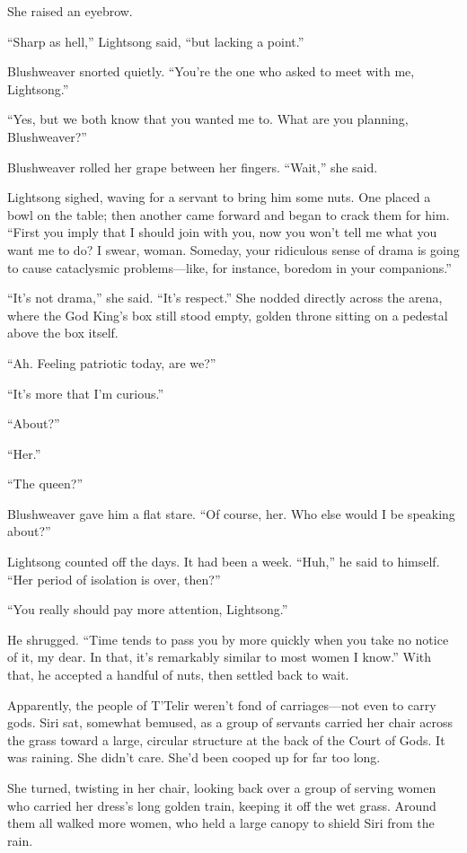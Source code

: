 She raised an eyebrow.

“Sharp as hell,” Lightsong said, “but lacking a point.”

Blushweaver snorted quietly. “You’re the one who asked to meet with me, Lightsong.”

“Yes, but we both know that you wanted me to. What are you planning, Blushweaver?”

Blushweaver rolled her grape between her fingers. “Wait,” she said.

Lightsong sighed, waving for a servant to bring him some nuts. One placed a bowl on the table; then another came forward and began to crack them for him. “First you imply that I should join with you, now you won’t tell me what you want me to do? I swear, woman. Someday, your ridiculous sense of drama is going to cause cataclysmic problems—like, for instance, boredom in your companions.”

“It’s not drama,” she said. “It’s respect.” She nodded directly across the arena, where the God King’s box still stood empty, golden throne sitting on a pedestal above the box itself.

“Ah. Feeling patriotic today, are we?”

“It’s more that I’m curious.”

“About?”

“Her.”

“The queen?”

Blushweaver gave him a flat stare. “Of course, her. Who else would I be speaking about?”

Lightsong counted off the days. It had been a week. “Huh,” he said to himself. “Her period of isolation is over, then?”

“You really should pay more attention, Lightsong.”

He shrugged. “Time tends to pass you by more quickly when you take no notice of it, my dear. In that, it’s remarkably similar to most women I know.” With that, he accepted a handful of nuts, then settled back to wait.

\orn

Apparently, the people of T’Telir weren’t fond of carriages—not even to carry gods. Siri sat, somewhat bemused, as a group of servants carried her chair across the grass toward a large, circular structure at the back of the Court of Gods. It was raining. She didn’t care. She’d been cooped up for far too long.

She turned, twisting in her chair, looking back over a group of serving women who carried her dress’s long golden train, keeping it off the wet grass. Around them all walked more women, who held a large canopy to shield Siri from the rain.

